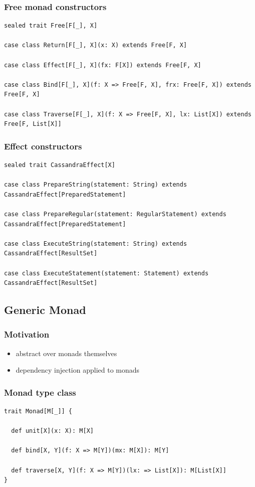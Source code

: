 \documentclass{beamer}
\begin{document}
\begin{frame}[fragile]
\frametitle{Free monad constructors}
\begin{lstlisting}
sealed trait Free[F[_], X]

case class Return[F[_], X](x: X) extends Free[F, X]

case class Effect[F[_], X](fx: F[X]) extends Free[F, X]

case class Bind[F[_], X](f: X => Free[F, X], frx: Free[F, X]) extends Free[F, X]

case class Traverse[F[_], X](f: X => Free[F, X], lx: List[X]) extends Free[F, List[X]]
\end{lstlisting}
\end{frame}

\begin{frame}[fragile]
\frametitle{Effect constructors}
\begin{lstlisting}
sealed trait CassandraEffect[X]

case class PrepareString(statement: String) extends CassandraEffect[PreparedStatement]

case class PrepareRegular(statement: RegularStatement) extends CassandraEffect[PreparedStatement]

case class ExecuteString(statement: String) extends CassandraEffect[ResultSet]

case class ExecuteStatement(statement: Statement) extends CassandraEffect[ResultSet]
\end{lstlisting}
\end{frame}

\subsection{Generic Monad}
\begin{frame}
\frametitle{Motivation}
\begin{itemize}
\item abstract over monads themselves
\item dependency injection applied to monads
\end{itemize}
\end{frame}

\begin{frame}[fragile]
\frametitle{Monad type class}
\begin{lstlisting}
trait Monad[M[_]] {

  def unit[X](x: X): M[X]

  def bind[X, Y](f: X => M[Y])(mx: M[X]): M[Y]
  
  def traverse[X, Y](f: X => M[Y])(lx: => List[X]): M[List[X]]
}
\end{lstlisting}
\end{frame}
\end{document}

